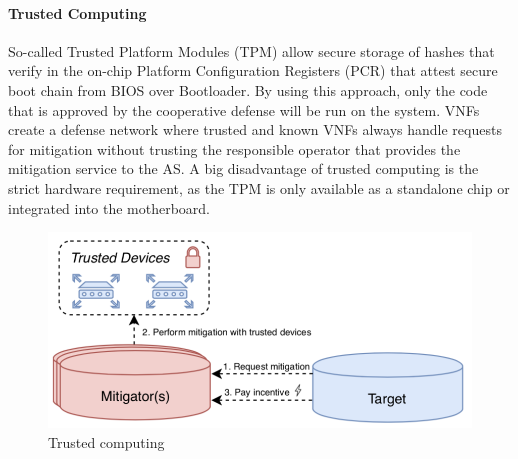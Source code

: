 \paragraph{Trusted Computing}
So-called Trusted Platform Modules (TPM) allow secure storage of hashes that verify in the on-chip Platform Configuration Registers (PCR) that attest secure boot chain from BIOS over Bootloader. By using this approach, only the code that is approved by the cooperative defense will be run on the system. VNFs create a defense network where trusted and known VNFs always handle requests for mitigation without trusting the responsible operator that provides the mitigation service to the AS.  A big disadvantage of trusted computing is the strict hardware requirement, as the TPM is only available as a standalone chip or integrated into the motherboard.
\begin{figure}[ht]
  \begin{center}
  \includegraphics[scale=0.5]{Talk7/img/ddos/cooperative_network_trusted_computing}
  \end{center}
  \caption{Trusted computing}
  \label{ddos_trusted_computing}
\end{figure}

